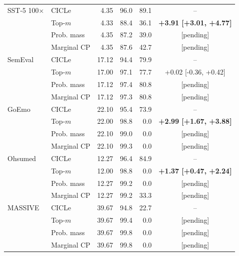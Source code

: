 \begin{tabular}{llrrrc}
\addlinespace
SST-5 100$\times$ & CICLe & 4.35 & 96.0 & 89.1 & -- \\
 & Top-$m$ & 4.33 & 88.4 & 36.1 & \textbf{+3.91 [+3.01, +4.77]} \\
 & Prob. mass & 4.35 & 87.2 & 39.0 & [pending] \\
 & Marginal CP & 4.35 & 87.6 & 42.7 & [pending] \\
\addlinespace
SemEval & CICLe & 17.12 & 94.4 & 79.9 & -- \\
 & Top-$m$ & 17.00 & 97.1 & 77.7 & +0.02 [-0.36, +0.42] \\
 & Prob. mass & 17.12 & 97.4 & 80.8 & [pending] \\
 & Marginal CP & 17.12 & 97.3 & 80.8 & [pending] \\
\addlinespace
GoEmo & CICLe & 22.10 & 95.4 & 73.9 & -- \\
 & Top-$m$ & 22.00 & 98.8 & 0.0 & \textbf{+2.99 [+1.67, +3.88]} \\
 & Prob. mass & 22.10 & 99.0 & 0.0 & [pending] \\
 & Marginal CP & 22.10 & 99.3 & 0.0 & [pending] \\
\addlinespace
Ohsumed & CICLe & 12.27 & 96.4 & 84.9 & -- \\
 & Top-$m$ & 12.00 & 98.8 & 0.0 & \textbf{+1.37 [+0.47, +2.24]} \\
 & Prob. mass & 12.27 & 99.2 & 0.0 & [pending] \\
 & Marginal CP & 12.27 & 99.2 & 33.3 & [pending] \\
\addlinespace
MASSIVE & CICLe & 39.67 & 94.8 & 22.7 & -- \\
 & Top-$m$ & 39.67 & 99.4 & 0.0 & [pending] \\
 & Prob. mass & 39.67 & 99.8 & 0.0 & [pending] \\
 & Marginal CP & 39.67 & 99.8 & 0.0 & [pending] \\
\bottomrule
\end{tabular}

